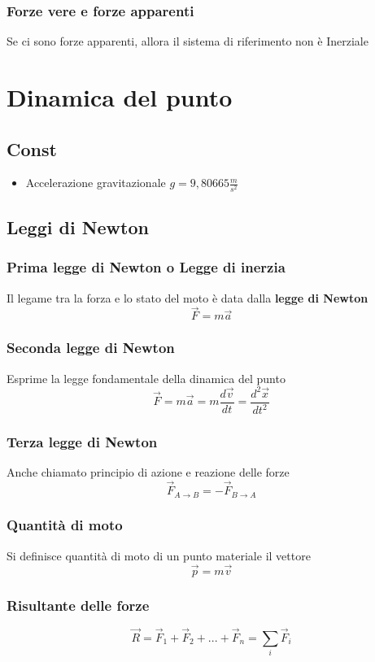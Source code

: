 \documentclass[a4paper]{report}
\begin{document}
  \subsection{Forze vere e forze apparenti}
  Se ci sono forze apparenti, allora il sistema di riferimento non è Inerziale

  \chapter{Dinamica del punto}
  \section{Const}
  \begin{itemize}
    \item Accelerazione gravitazionale $g = 9,80665 \frac{m}{s^2}$
  \end{itemize}

  \section{Leggi di Newton}
  \subsection{Prima legge di Newton o Legge di inerzia}
  Il legame tra la forza e lo stato del moto è data dalla \textbf{legge di Newton}
  \[ \vec{F} = m\vec{a} \]

  \subsection{Seconda legge di Newton}
  Esprime la legge fondamentale della dinamica del punto
  \[ \vec{F} = m\vec{a} = m\frac{d\vec{v}}{dt} = \frac{d^2\vec{x}}{dt^2} \]

  \subsection{Terza legge di Newton}
  Anche chiamato principio di azione e reazione delle forze
  \[ \vec{F}_{A \rightarrow B} = -\vec{F}_{B \rightarrow A} \]

  \subsection{Quantità di moto}
  Si definisce quantità di moto di un punto materiale il vettore
  \[ \vec{p} = m\vec{v} \]

  \subsection{Risultante delle forze}
  \[ \vec{R} = \vec{F}_1 + \vec{F}_2 + ... +\vec{F}_n = \sum_i \vec{F}_i \]
\end{document}
